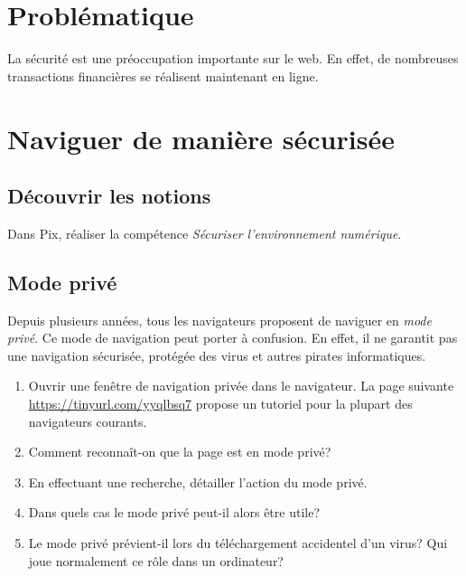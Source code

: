 \documentclass[a4paper,11pt]{article}
\begin{document}
\begin{Form}
\section{Problématique}
La sécurité est une préoccupation importante sur le web. En effet, de nombreuses transactions financières se réalisent maintenant en ligne.
\begin{center}
\end{center}
\section{Naviguer de manière sécurisée}
\subsection{Découvrir les notions}
\begin{activite}
Dans Pix, réaliser la compétence \emph{Sécuriser l'environnement numérique}.
\end{activite}
\subsection{Mode privé}
Depuis plusieurs années, tous les navigateurs proposent de naviguer en \emph{mode privé}. Ce mode de navigation peut porter à confusion. En effet, il ne garantit pas une navigation sécurisée, protégée des virus et autres pirates informatiques.
\begin{activite}
\begin{enumerate}
\item Ouvrir une fenêtre de navigation privée dans le navigateur. La page suivante \mbox{\url{https://tinyurl.com/yyqlbsq7}} propose un tutoriel pour la plupart des navigateurs courants.
\item Comment reconnaît-on que la page est en mode privé?
\item En effectuant une recherche, détailler l'action du mode privé.
\item Dans quels cas le mode privé peut-il alors être utile?
\item Le mode privé prévient-il lors du téléchargement accidentel d'un virus? Qui joue normalement ce rôle dans un ordinateur? 
\end{enumerate}
\end{activite}

\end{Form}
\end{document}
